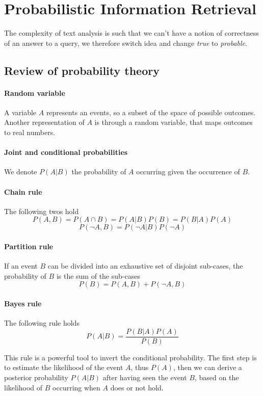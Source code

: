 \section{Probabilistic Information Retrieval}
The complexity of text analysis is such that we can't have 
a notion of correctness of an answer to a query, we therefore switch
idea and change \emph{true} to \emph{probable}.

\subsection{Review of probability theory}

\paragraph{Random variable}
A variable $A$ represents an events, so a subset of the space of possible
outcomes. Another representation of $A$ is through a random variable, 
that maps outcomes to real numbers.

\paragraph{Joint and conditional probabilities}
We denote $P(A|B)$ the probability of $A$ occurring given the occurrence of $B$.

\paragraph{Chain rule}
The following twos hold
$$P(A,B) = P(A \cap B) = P(A|B)P(B) = P(B|A)P(A)$$
$$P(\neg A, B) = P(\neg A|B)P(\neg A)$$

\paragraph{Partition rule}
If an event $B$ can be divided into an exhaustive set of disjoint sub-cases, 
the probability of $B$ is the sum of the sub-cases
$$P(B) = P(A,B) + P(\neg A, B)$$

\paragraph{Bayes rule} The following rule holds
$$P(A|B) = \frac{P(B|A)P(A)}{P(B)}$$

This rule is a powerful tool to invert the conditional probability. 
The first step is to estimate the likelihood of the event $A$, thus $P(A)$, 
then we can derive a posterior probability $P(A|B)$ after having seen the 
event $B$, based on the likelihood of $B$ occurring when $A$ does or not hold.

